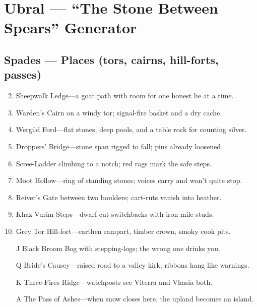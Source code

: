 \chapter{Ubral --- ``The Stone Between Spears'' Generator}

\section*{Spades --- Places (tors, cairns, hill-forts, passes)}
\begin{enumerate}
\setcounter{enumi}{1}
\item Sheepwalk Ledge---a goat path with room for one honest lie at a time.
\item Warden's Cairn on a windy tor; signal-fire basket and a dry cache.
\item Wergild Ford---flat stones, deep pools, and a table rock for counting silver.
\item Droppers' Bridge---stone span rigged to fall; pins already loosened.
\item Scree-Ladder climbing to a notch; red rags mark the safe steps.
\item Moot Hollow---ring of standing stones; voices carry and won't quite stop.
\item Reiver's Gate between two boulders; cart-ruts vanish into heather.
\item Khaz-Vurim Steps---dwarf-cut switchbacks with iron mile studs.
\item Grey Tor Hill-fort---earthen rampart, timber crown, smoky cook pits.
\item[J] Black Broom Bog with stepping-logs; the wrong one drinks you.
\item[Q] Bride's Causey---raised road to a valley kirk; ribbons hang like warnings.
\item[K] Three-Fires Ridge---watchposts see Viterra and Vhasia both.
\item[A] The Pass of Ashes---when snow closes here, the upland becomes an island.
\end{enumerate}

